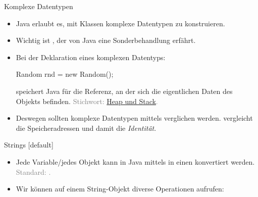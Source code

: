 \begin{frame}[fragile]{Komplexe Datentypen}
    \begin{itemize}[<+(1)->]
        \widei
        \item Java erlaubt es, mit Klassen komplexe Datentypen zu konstruieren.
        \item Wichtig ist , der von Java eine Sonderbehandlung erfährt.
        \item Bei der Deklaration eines komplexen Datentyps:\pause{}
\begin{plainjava}
Random rnd = new Random();
\end{plainjava}
        \pause{}speichert Java für  die Referenz,\pause{} an der sich die eigentlichen Daten des Objekts befinden. \textcolor{gray}{Stichwort: \hyperlink{mrk:heap-and-stack}{Heap und Stack}.}
        \item Deswegen sollten komplexe Datentypen mittels  verglichen werden.\pause{} \say{\bjava{==}} vergleicht die Speicheradressen und damit die \emph{Identität}.
    \end{itemize}
\end{frame}

\begin{frame}{Strings}
    [default]%
    \begin{itemize}[<+(1)->]
        \widei
        \item Jede Variable\thinspace /\thinspace jedes Objekt kann in Java mittels  in einen  konvertiert werden. \textcolor{gray}{Standard: .}
        \item Wir können auf einem String-Objekt diverse Operationen aufrufen: 
    \end{itemize}
\end{frame}

